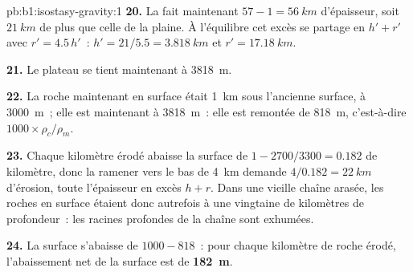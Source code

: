 \begin{solution}{pb:b1:isostasy-gravity:1}
\textbf{20.} La  fait maintenant $57 - 1 = \qty{56}{km}$ d'épaisseur, soit $\qty{21}{km}$ de plus
que celle de la plaine. À l'équilibre cet excès se partage en $h' + r'$ avec
$r' = 4.5\,h'$~: $h' = 21/5.5 = \qty{3.818}{km}$ et $r' = \qty{17.18}{km}$.

\textbf{21.} Le plateau se tient maintenant à \qty{3818}{m}.

\textbf{22.} La roche maintenant en surface était \qty{1}{km} sous l'ancienne surface,
à \qty{3000}{m}~; elle est maintenant à \qty{3818}{m}~: elle est remontée de \qty{818}{m},
c'est-à-dire $1000\times\rho_c/\rho_m$.

\textbf{23.} Chaque kilomètre érodé abaisse la surface de $1 - 2700/3300 =
0.182$ de kilomètre, donc la ramener vers le bas de \qty{4}{km} demande
$4/0.182 = \qty{22}{km}$ d'érosion, toute l'épaisseur en excès $h + r$. Dans une
vieille chaîne arasée, les roches en surface étaient donc autrefois à une vingtaine
de kilomètres de profondeur~: les racines profondes de la chaîne sont exhumées.

\textbf{24.} La surface s'abaisse de $1000 - 818$~: pour chaque kilomètre de roche
érodé, l'abaissement net de la surface est de
\textbf{\qty[text-series-to-math=true]{182}{m}}.
\end{solution}

